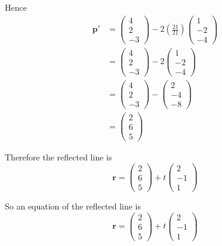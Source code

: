 \documentclass[leqno]{article}
\begin{document}
\begin{enumerate}[
  label=\textbf{\arabic*.},
  leftmargin=*,
  topsep=0pt,
  partopsep=0pt,
  parsep=0pt
]
\begin{tcolorbox}[colback=white, colframe=scarlet, title={\textbf{Solution}}, breakable, grow to left by=6mm, grow to right by=10mm]
\begin{enumerate}[label=\textbf{(\roman*)}]
Hence
\begin{align*}
\mathbf p'
&=\begin{pmatrix}4\\2\\-3\end{pmatrix}
-2\left(\frac{21}{21}\right)\begin{pmatrix}1\\-2\\-4\end{pmatrix} \\
&=\begin{pmatrix}4\\2\\-3\end{pmatrix}
-2\begin{pmatrix}1\\-2\\-4\end{pmatrix} \\
&=\begin{pmatrix}4\\2\\-3\end{pmatrix}
-\begin{pmatrix}2\\-4\\-8\end{pmatrix} \\
&=\begin{pmatrix}2\\6\\5\end{pmatrix}
\end{align*}

Therefore the reflected line is
\[
\mathbf r=\begin{pmatrix}2\\6\\5\end{pmatrix}+t\begin{pmatrix}2\\-1\\1\end{pmatrix}
\]

So an equation of the reflected line is
\[
\mathbf r=\begin{pmatrix}2\\6\\5\end{pmatrix}+t\begin{pmatrix}2\\-1\\1\end{pmatrix}
\]
\end{enumerate}
\end{tcolorbox}



\end{enumerate}
\end{document}
